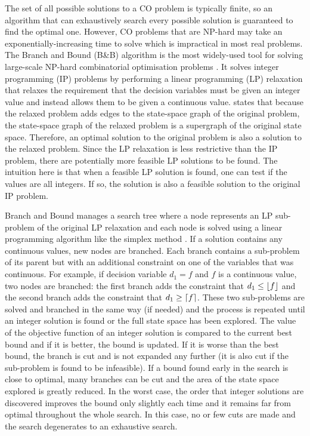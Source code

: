 The set of all possible solutions to a CO problem is typically finite, so an algorithm that can exhaustively search every possible solution is guaranteed to find the optimal one. However, CO problems that are NP-hard \citep{garey1979computers} may take an exponentially-increasing time to solve which is impractical in most real problems. The Branch and Bound (B\&B) algorithm \citep{land1960automatic} is the most widely-used tool for solving large-scale NP-hard combinatorial optimisation problems \citep{clausen1999branch}. It solves integer programming (IP) problems by performing a linear programming (LP) relaxation that relaxes the requirement that the decision variables must be given an integer value and instead allows them to be given a continuous value. \citet{russell2016artificial} states that because the relaxed problem adds edges to the state-space graph of the original problem, the state-space graph of the relaxed problem is a supergraph of the original state space. Therefore, an optimal solution to the original problem is also a solution to the relaxed problem. Since the LP relaxation is less restrictive than the IP problem, there are potentially more feasible LP solutions to be found. The intuition here is that when a feasible LP solution is found, one can test if the values are all integers. If so, the solution is also a feasible solution to the original IP problem.

Branch and Bound manages a search tree where a node represents an LP sub-problem of the original LP relaxation and each node is solved using a linear programming algorithm like the simplex method \citep{dantzig1949programming}. If a solution contains any continuous values, new nodes are branched. Each branch contains a sub-problem of its parent but with an additional constraint on one of the variables that was continuous. For example, if decision variable $d_1 = f$ and $f$ is a continuous value, two nodes are branched: the first branch adds the constraint that $d_1 \leq \floor*{f}$ and the second branch adds the constraint that $d_1 \geq \ceil*{f}$. These two sub-problems are solved and branched in the same way (if needed) and the process is repeated until an integer solution is found or the full state space has been explored. The value of the objective function of an integer solution is compared to the current best bound and if it is better, the bound is updated. If it is worse than the best bound, the branch is cut and is not expanded any further (it is also cut if the sub-problem is found to be infeasible). If a bound found early in the search is close to optimal, many branches can be cut and the area of the state space explored is greatly reduced. In the worst case, the order that integer solutions are discovered improves the bound only slightly each time and it remains far from optimal throughout the whole search. In this case, no or few cuts are made and the search degenerates to an exhaustive search.

